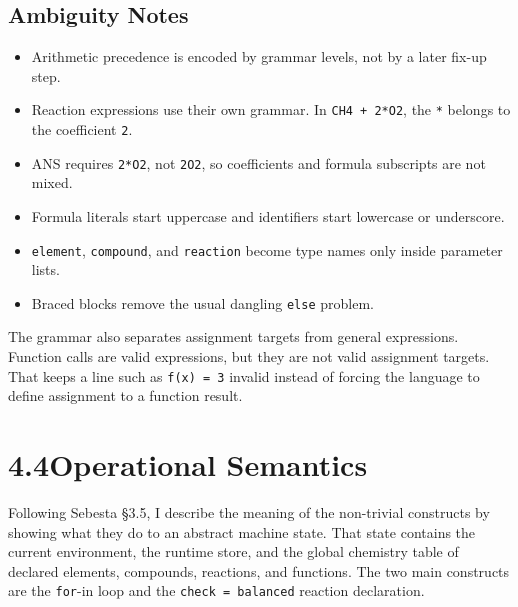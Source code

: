 \documentclass[11pt,a4paper]{article}
\newcommand{\code}[1]{\texttt{#1}}
\begin{document}
\subsection{Ambiguity Notes}
\begin{itemize}
  \item Arithmetic precedence is encoded by grammar levels, not by a later fix-up step.
  \item Reaction expressions use their own grammar. In \code{CH4 + 2*O2}, the \code{*} belongs to the coefficient \code{2}.
  \item ANS requires \code{2*O2}, not \code{2O2}, so coefficients and formula subscripts are not mixed.
  \item Formula literals start uppercase and identifiers start lowercase or underscore.
  \item \code{element}, \code{compound}, and \code{reaction} become type names only inside parameter lists.
  \item Braced blocks remove the usual dangling \code{else} problem.
\end{itemize}

The grammar also separates assignment targets from general expressions. Function calls are
valid expressions, but they are not valid assignment targets. That keeps a line such as
\code{f(x) = 3} invalid instead of forcing the language to define assignment to a function result.

\newpage
\section{4.4\quad Operational Semantics}

Following Sebesta \S3.5, I describe the meaning of the non-trivial constructs by showing what they do to an abstract machine state. That state contains the current environment, the runtime store, and the global chemistry table of declared elements, compounds, reactions, and functions. The two main constructs are the \code{for}-in loop and the \code{check = balanced} reaction declaration.
\end{document}
